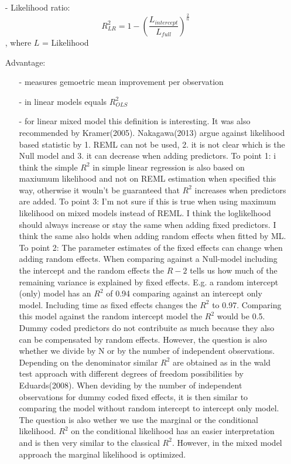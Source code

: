\documentclass[11pt, a4paper]{article}\usepackage[]{graphicx}\usepackage[]{color}
\begin{document}
\begin{enumerate}

\item[-] Likelihood ratio: \begin{equation} R^2_{LR} = 1 -  \left( \frac{L_{intercept}}{L_{full}} \right)^\frac{2}{n} \end{equation}, where $L$ = Likelihood

Advantage: 
\begin {enumerate}
 \item[-] measures gemoetric mean improvement per observation
 \item[-] in linear models equals $R^2_{OLS}$
 \item[-] for linear mixed model this definition is interesting. It was also recommended by Kramer(2005). Nakagawa(2013) argue against likelihood based statistic by 1. REML can not be used, 2. it is not clear which is the Null model and 3. it can decrease when adding predictors. To point 1: i think the simple $R^2$ in simple linear regression is also based on maxiumum likelihood and not on REML estimation when specified this way, otherwise it wouln't be guaranteed that $R^2$ increases when predictors are added. To point 3: I'm not sure if this is true when using maximum likelihood on mixed models instead of REML. I think the loglikelhood should always increase or stay the same when adding fixed predictors.  I think the same also holds when adding random effects when fitted by ML. To point 2: The parameter estimates of the fixed effects can change when adding random effects. When comparing against a Null-model including the intercept and the random effects the $R-2$ tells us how much of the remaining variance is explained by fixed effects. E.g. a random intercept (only) model has an $R^2$ of 0.94 comparing against an intercept only model. Including time as fixed effects changes the $R^2$ to 0.97. Comparing this model against the random intercept model the $R^2$ would be 0.5. Dummy coded predictors do not contribuite as much because they also can be compensated by random effects. However, the question is also whether we divide by N or by the number of independent observations. Depending on the denominator similar $R^2$ are obtained as in the wald test approach with different degrees of freedom possibilities by Eduards(2008). When deviding by the number of independent observations for dummy coded fixed effects, it is then similar to comparing the model without random intercept to intercept only model. The question is also wether we use the marginal or the conditional likelihood. $R^2$ on the conditional likelihood has an easier interpretation and is then very similar to the classical $R^2$. However, in the mixed model approach the marginal likelihood is optimized. 
 

\end{enumerate}
\end{enumerate}
\end{document}
